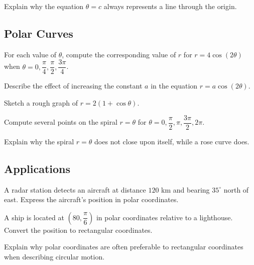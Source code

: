 \begin{exercise}
Explain why the equation $\theta=c$ always represents a line through the
origin.
\end{exercise}

\subsection*{Polar Curves}
\begin{exercise}
For each value of $\theta$, compute the corresponding value of $r$ for
$r = 4\cos(2\theta)$ when $\theta = 0, \dfrac{\pi}{4}, \dfrac{\pi}{2},
\dfrac{3\pi}{4}$.
\end{exercise}

\begin{exercise}
Describe the effect of increasing the constant $a$ in the equation
$r = a\cos(2\theta)$.
\end{exercise}

\begin{exercise}
Sketch a rough graph of $r = 2(1+\cos\theta)$.
\end{exercise}

\begin{exercise}
Compute several points on the spiral $r=\theta$ for $\theta = 0,
\dfrac{\pi}{2}, \pi, \dfrac{3\pi}{2}, 2\pi$.
\end{exercise}

\begin{exercise}
Explain why the spiral $r=\theta$ does not close upon itself, while a
rose curve does.
\end{exercise}

\subsection*{Applications}
\begin{exercise}
A radar station detects an aircraft at distance $120$ km and bearing
$35^\circ$ north of east. Express the aircraft's position in polar
coordinates.
\end{exercise}

\begin{exercise}
A ship is located at $\left(80,\dfrac{\pi}{6}\right)$ in polar
coordinates relative to a lighthouse. Convert the position to
rectangular coordinates.
\end{exercise}

\begin{exercise}
Explain why polar coordinates are often preferable to rectangular
coordinates when describing circular motion.
\end{exercise}

